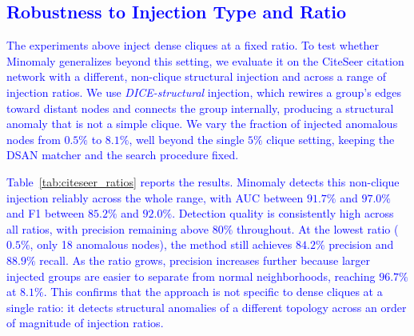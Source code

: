 \documentclass[preprint,12pt]{elsarticle}
\newcommand{\new}[1]{\textcolor{blue}{#1}}
\theoremstyle{plain}
\theoremstyle{definition}
\theoremstyle{remark}
\begin{document}

\subsection{\new{Robustness to Injection Type and Ratio}}
\label{sec:citeseer}
\new{The experiments above inject dense cliques at a fixed ratio. To test whether Minomaly generalizes beyond this setting, we evaluate it on the CiteSeer citation network with a different, non-clique structural injection and across a range of injection ratios. We use \emph{DICE-structural} injection, which rewires a group's edges toward distant nodes and connects the group internally, producing a structural anomaly that is not a simple clique. We vary the fraction of injected anomalous nodes from $0.5\%$ to $8.1\%$, well beyond the single $5\%$ clique setting, keeping the DSAN matcher and the search procedure fixed.}

\new{Table~\ref{tab:citeseer_ratios} reports the results. Minomaly detects this non-clique injection reliably across the whole range, with AUC between $91.7\%$ and $97.0\%$ and F1 between $85.2\%$ and $92.0\%$. Detection quality is consistently high across all ratios, with precision remaining above $80\%$ throughout. At the lowest ratio ($0.5\%$, only 18 anomalous nodes), the method still achieves $84.2\%$ precision and $88.9\%$ recall. As the ratio grows, precision increases further because larger injected groups are easier to separate from normal neighborhoods, reaching $96.7\%$ at $8.1\%$. This confirms that the approach is not specific to dense cliques at a single ratio: it detects structural anomalies of a different topology across an order of magnitude of injection ratios.}
\end{document}
